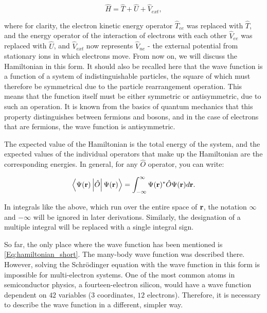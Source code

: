 \begin{equation}
    \label{Eq:Hamiltonian_full_HB_short}
    \hat{H}=\hat{T}+\hat{U}+\hat{V}_{ext},
\end{equation}

where for clarity, the electron kinetic energy operator $\hat{T}_{ee}$ was replaced with $\hat{T}$, and the energy operator of the interaction of electrons with each other $\hat{V}_{ee}$ was replaced with $\hat{U}$, and $\hat{V}_{ext}$ now represents $\hat{V}_{ne}$ - the external potential from stationary ions in which electrons move.
From now on, we will discuss the Hamiltonian in this form.
It should also be recalled here that the wave function is a function of a system of indistinguishable particles, the square of which must therefore be symmetrical due to the particle rearrangement operation.
This means that the function itself must be either symmetric or antisymmetric, due to such an operation.
It is known from the basics of quantum mechanics that this property distinguishes between fermions and bosons, and in the case of electrons that are fermions, the wave function is antisymmetric.

The expected value of the Hamiltonian is the total energy of the system, and the expected values of the individual operators that make up the Hamiltonian are the corresponding energies. In general, for any $\hat{O}$ operator, you can write:

\begin{equation}
    \label{Eq:expectation_value}
    \left<\Psi(\mathbf{r})\left|\hat{O}\right|\Psi(\mathbf{r})\right>=\int_{-\infty}^{\infty}\Psi(\mathbf{r})^*\hat{O}\Psi(\mathbf{r})d\mathbf{r}.
\end{equation}

In integrals like the above, which run over the entire space of $\mathbf{r}$, the notation $\infty$ and $-\infty$ will be ignored in later derivations.
Similarly, the designation of a multiple integral will be replaced with a single integral sign.

So far, the only place where the wave function has been mentioned is \ref{Eq:hamiltonian_short}.
The many-body wave function was described there.
However, solving the Schr\"odinger equation with the wave function in this form is impossible for multi-electron systems.
One of the most common atoms in semiconductor physics, a fourteen-electron silicon, would have a wave function dependent on $42$ variables ($3$ coordinates, $12$ electrons).
Therefore, it is necessary to describe the wave function in a different, simpler way.

